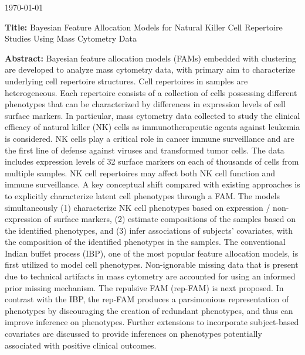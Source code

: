 \documentclass[12pt]{article}
\begin{document}
\onehalfspacing

\noindent
\today

\vspace*{0.2in}
\noindent
{\bf Title:} Bayesian Feature Allocation Models for Natural Killer Cell Repertoire Studies Using Mass Cytometry Data

\vspace*{0.2in}
\noindent
{\bf Abstract:}  Bayesian feature allocation models (FAMs) embedded with
clustering are developed to analyze mass cytometry data, with primary aim to
characterize underlying cell repertoire structures.   Cell repertoires in
samples are heterogeneous. Each repertoire consists of a collection of cells
possessing different phenotypes that can be characterized by differences in
expression levels of cell surface markers.  In particular, mass cytometry data
collected to study the clinical efficacy of natural killer (NK) cells as
immunotherapeutic agents against leukemia is considered. NK cells play a
critical role in cancer immune surveillance and are the first line of defense
against viruses and transformed tumor cells.  The data includes expression
levels of 32 surface markers on each of thousands of cells from multiple
samples. NK cell repertoires may affect both NK cell function and immune
surveillance.  A key conceptual shift compared with existing approaches is to
explicitly characterize latent cell phenotypes through a FAM.  The models
simultaneously (1) characterize NK cell phenotypes based on expression /
non-expression of surface markers, (2) estimate compositions of the samples
based on the identified phenotypes, and (3) infer associations of subjects'
covariates, with the composition of the identified phenotypes in the samples.
The conventional Indian buffet process (IBP), one of the most popular feature
allocation models, is first utilized to model cell phenotypes. Non-ignorable
missing data that is present due to technical artifacts in mass cytometry are
accounted for using an informed prior missing mechanism. The repulsive FAM
(rep-FAM) is next proposed.  In contrast with the IBP, the rep-FAM produces a
parsimonious representation of phenotypes by discouraging the creation of
redundant phenotypes, and thus can improve inference on phenotypes.  Further
extensions to incorporate subject-based covariates are discussed to provide
inferences on phenotypes potentially associated with positive clinical
outcomes.  
\end{document}
